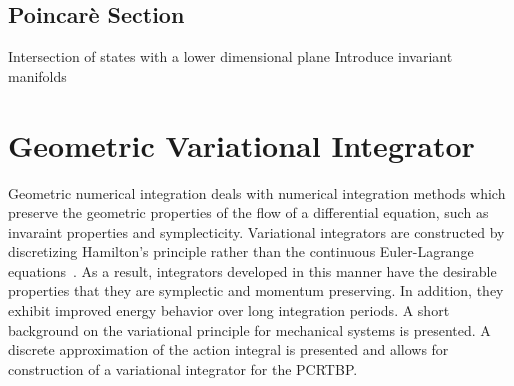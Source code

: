 \documentclass[letterpaper, preprint, paper,11pt]{AAS}	%
\begin{document}
\subsection{Poincar\`e Section}
Intersection of states with a lower dimensional plane
Introduce invariant manifolds

\section{Geometric Variational Integrator}\label{sec:discrete_var}
Geometric numerical integration deals with numerical integration methods which preserve the geometric properties of the flow of a differential equation, such as invaraint properties and symplecticity.
Variational integrators are constructed by discretizing Hamilton's principle rather than the continuous Euler-Lagrange equations~\cite{marsden2001}.
As a result, integrators developed in this manner have the desirable properties that they are symplectic and momentum preserving.
In addition, they exhibit improved energy behavior over long integration periods.
A short background on the variational principle for mechanical systems is presented. 
A discrete approximation of the action integral is presented and allows for construction of a variational integrator for the PCRTBP.
\end{document}
